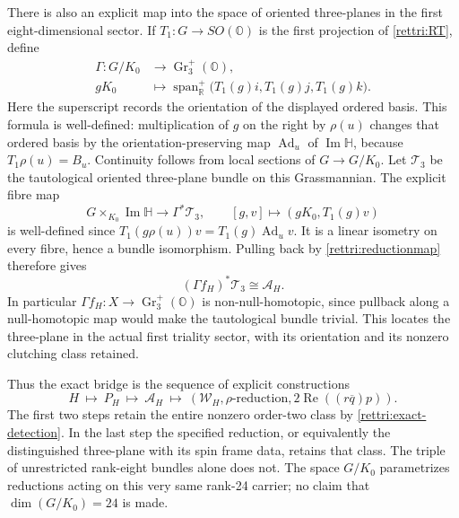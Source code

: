 \documentclass[11pt]{article}
\theoremstyle{definition}
\begin{document}
There is also an explicit map into the space of oriented
three-planes in the first eight-dimensional sector. If
$T_1:G\to SO(\mathbb O)$ is the first projection of
\eqref{rettri:RT}, define
\begin{equation}
 \begin{aligned}
 \Gamma:G/K_0&\longrightarrow\operatorname{Gr}_3^+(\mathbb O),\\
 gK_0&\longmapsto
 \operatorname{span}_{\mathbb R}^{+}
       \bigl(T_1(g)i,T_1(g)j,T_1(g)k\bigr).
 \end{aligned}
 \label{rettri:Grassmann}
\end{equation}
Here the superscript records the orientation of the displayed
ordered basis. This formula is well-defined: multiplication of
$g$ on the right by $\rho(u)$ changes that ordered basis by
the orientation-preserving map $\operatorname{Ad}_u$ of
$\operatorname{Im}\mathbb H$, because $T_1\rho(u)=B_u$.
Continuity follows from local sections of $G\to G/K_0$.
Let $\mathcal T_3$ be the tautological oriented three-plane
bundle on this Grassmannian. The explicit fibre map
\[
 G\times_{K_0}\operatorname{Im}\mathbb H
       \longrightarrow\Gamma^*\mathcal T_3,\qquad
 [g,v]\longmapsto(gK_0,T_1(g)v)
\]
is well-defined since
$T_1(g\rho(u))v=T_1(g)\operatorname{Ad}_u v$.
It is a linear isometry on every fibre, hence a bundle
isomorphism. Pulling back by \eqref{rettri:reductionmap}
therefore gives
\[
 (\Gamma f_H)^*\mathcal T_3\cong\mathcal A_H.
\]
In particular $\Gamma f_H:X\to\operatorname{Gr}_3^+(\mathbb O)$
is non-null-homotopic, since pullback along a null-homotopic
map would make the tautological bundle trivial. This locates
the three-plane in the actual first triality sector, with its
orientation and its nonzero clutching class retained.

Thus the exact bridge is the sequence of explicit constructions
\[
 H\ \longmapsto\ P_H\ \longmapsto\ \mathcal A_H
 \ \longmapsto\ (\mathcal W_H,\rho\text{-reduction},
                   2\operatorname{Re}((r\overline q)p)).
\]
The first two steps retain the entire nonzero order-two class
by \eqref{rettri:exact-detection}. In the last step the
specified reduction, or equivalently the distinguished
three-plane with its spin frame data, retains that class.
The triple of unrestricted rank-eight bundles alone does not.
The space $G/K_0$ parametrizes reductions acting on this very
same rank-24 carrier; no claim that $\dim(G/K_0)=24$ is made.
\end{document}
